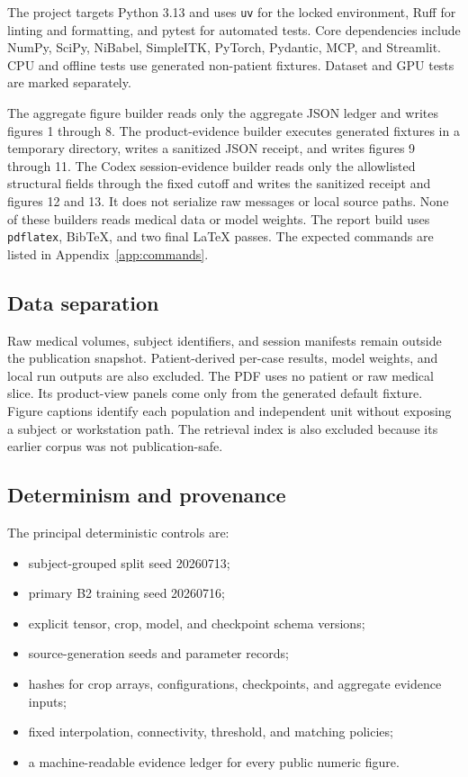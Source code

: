 \documentclass[11pt]{article}
\begin{document}
The project targets Python 3.13 and uses \texttt{uv} for the locked environment, Ruff for linting and formatting, and pytest for automated tests. Core dependencies include NumPy, SciPy, NiBabel, SimpleITK, PyTorch, Pydantic, MCP, and Streamlit. CPU and offline tests use generated non-patient fixtures. Dataset and GPU tests are marked separately.

The aggregate figure builder reads only the aggregate JSON ledger and writes figures 1 through 8. The product-evidence builder executes generated fixtures in a temporary directory, writes a sanitized JSON receipt, and writes figures 9 through 11. The Codex session-evidence builder reads only the allowlisted structural fields through the fixed cutoff and writes the sanitized receipt and figures 12 and 13. It does not serialize raw messages or local source paths. None of these builders reads medical data or model weights. The report build uses \texttt{pdflatex}, BibTeX, and two final LaTeX passes. The expected commands are listed in Appendix~\ref{app:commands}.

\subsection{Data separation}

Raw medical volumes, subject identifiers, and session manifests remain outside the publication snapshot. Patient-derived per-case results, model weights, and local run outputs are also excluded. The PDF uses no patient or raw medical slice. Its product-view panels come only from the generated default fixture. Figure captions identify each population and independent unit without exposing a subject or workstation path. The retrieval index is also excluded because its earlier corpus was not publication-safe.

\subsection{Determinism and provenance}

The principal deterministic controls are:

\begin{itemize}
  \item subject-grouped split seed 20260713;
  \item primary B2 training seed 20260716;
  \item explicit tensor, crop, model, and checkpoint schema versions;
  \item source-generation seeds and parameter records;
  \item hashes for crop arrays, configurations, checkpoints, and aggregate evidence inputs;
  \item fixed interpolation, connectivity, threshold, and matching policies;
  \item a machine-readable evidence ledger for every public numeric figure.
\end{itemize}
\end{document}
